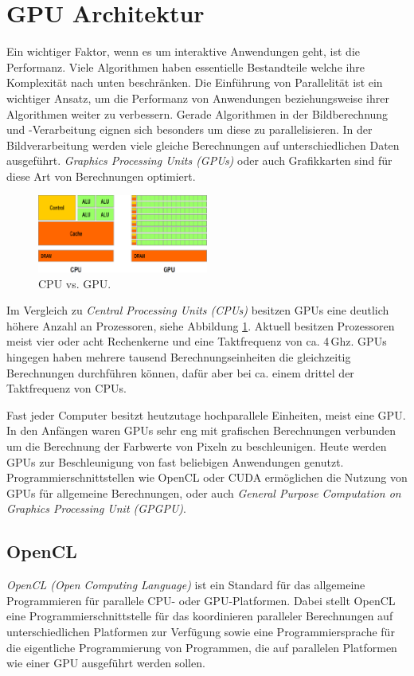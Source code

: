 \section{GPU Architektur}\label{sec::gpuarc}
Ein wichtiger Faktor, wenn es um interaktive Anwendungen geht, ist die Performanz.
Viele Algorithmen haben essentielle Bestandteile welche ihre Komplexität nach unten beschränken.
Die Einführung von Parallelität ist ein wichtiger Ansatz, um die Performanz von Anwendungen beziehungsweise ihrer Algorithmen weiter zu verbessern.
Gerade Algorithmen in der Bildberechnung und -Verarbeitung eignen sich besonders um diese zu parallelisieren.
In der Bildverarbeitung werden viele gleiche Berechnungen auf unterschiedlichen Daten ausgeführt.
\emph{Graphics Processing Units (GPUs)} oder auch Grafikkarten sind für diese Art von Berechnungen optimiert.
\begin{figure}
	\centering
	\includegraphics[width=0.5\textwidth]{../../Grafiken/CPU-GPU-Structures1.png}
	\caption{CPU vs. GPU. \cite{kcg}}
	\label{fig::ga01}
\end{figure}
Im Vergleich zu \emph{Central Processing Units (CPUs)} besitzen GPUs eine deutlich höhere Anzahl an Prozessoren, siehe Abbildung \ref{fig::ga01}.
Aktuell besitzen Prozessoren meist vier oder acht Rechenkerne und eine Taktfrequenz von ca. 4\,Ghz.
GPUs hingegen haben mehrere tausend Berechnungseinheiten die gleichzeitig Berechnungen durchführen können, dafür aber bei ca. einem drittel der Taktfrequenz von CPUs.

Fast jeder Computer besitzt heutzutage hochparallele Einheiten, meist eine GPU.
In den Anfängen waren GPUs sehr eng mit grafischen Berechnungen verbunden um die Berechnung der Farbwerte von Pixeln zu beschleunigen.
Heute werden GPUs zur Beschleunigung von fast beliebigen Anwendungen genutzt.
Programmierschnittstellen wie OpenCL oder CUDA ermöglichen die Nutzung von GPUs für allgemeine Berechnungen, oder auch \emph{General Purpose Computation on Graphics Processing Unit (GPGPU)}.

\subsection*{OpenCL}
\emph{OpenCL (Open Computing Language)} ist ein Standard für das allgemeine Programmieren für parallele CPU- oder GPU-Platformen.
Dabei stellt OpenCL eine Programmierschnittstelle für das koordinieren paralleler Berechnungen auf unterschiedlichen Platformen zur Verfügung sowie eine Programmiersprache für die eigentliche Programmierung von Programmen, die auf parallelen Platformen wie einer GPU ausgeführt werden sollen.

